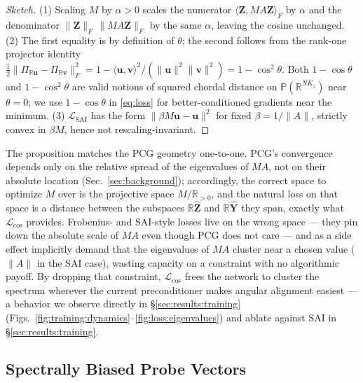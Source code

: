 \documentclass[acmtog]{acmart}
\theoremstyle{plain}
\begin{document}
\begin{proof}[Sketch]
(1) Scaling $M$ by $\alpha\!>\!0$ scales the numerator
$\langle\mathbf{Z},MA\mathbf{Z}\rangle_F$ by $\alpha$ and the denominator
$\|\mathbf{Z}\|_F\,\|MA\mathbf{Z}\|_F$ by the same $\alpha$, leaving the cosine unchanged.
(2) The first equality is by definition of $\theta$; the second follows from the rank-one
projector identity
$\tfrac{1}{2}\|\Pi_{\mathbb{R}\mathbf{u}}-\Pi_{\mathbb{R}\mathbf{v}}\|_F^2
= 1 - \langle\mathbf{u},\mathbf{v}\rangle^2/(\|\mathbf{u}\|^2\|\mathbf{v}\|^2) = 1-\cos^2\theta$.
Both $1\!-\!\cos\theta$ and $1\!-\!\cos^2\theta$ are valid notions of squared chordal
distance on $\mathbb{P}(\mathbb{R}^{NK_z})$ near $\theta\!=\!0$; we use $1-\cos\theta$ in
\eqref{eq:loss} for better-conditioned gradients near the minimum.
(3) $\mathcal{L}_{\mathrm{SAI}}$ has the form $\|\beta M\mathbf{u}-\mathbf{u}\|^2$ for fixed
$\beta\!=\!1/\|A\|$, strictly convex in $\beta M$, hence not rescaling-invariant.
\end{proof}

\noindent
The proposition matches the PCG geometry one-to-one. PCG's convergence depends only on the
relative spread of the eigenvalues of $MA$, not on their absolute location
(Sec.~\ref{sec:background}); accordingly, the correct space to optimize $M$ over is the
projective space $M/\mathbb{R}_{>0}$, and the natural loss on that space is a distance
between the subspaces $\mathbb{R}\widehat{\mathbf{Z}}$ and $\mathbb{R}\widehat{\mathbf{Y}}$
they span, exactly what $\mathcal{L}_{\cos}$ provides. Frobenius- and SAI-style losses live
on the wrong space --- they pin down the absolute scale of $MA$ even though PCG does not
care --- and as a side effect implicitly demand that the eigenvalues of $MA$ cluster near a
chosen value ($\|A\|$ in the SAI case), wasting capacity on a constraint with no algorithmic
payoff. By dropping that constraint, $\mathcal{L}_{\cos}$ frees the network to cluster the
spectrum wherever the current preconditioner makes angular alignment easiest --- a behavior
we observe directly in \S\ref{sec:results:training}
(Figs.~\ref{fig:training:dynamics}--\ref{fig:loss:eigenvalues}) and ablate against SAI in
\S\ref{sec:results:training}.

\subsection{Spectrally Biased Probe Vectors}
\end{document}
